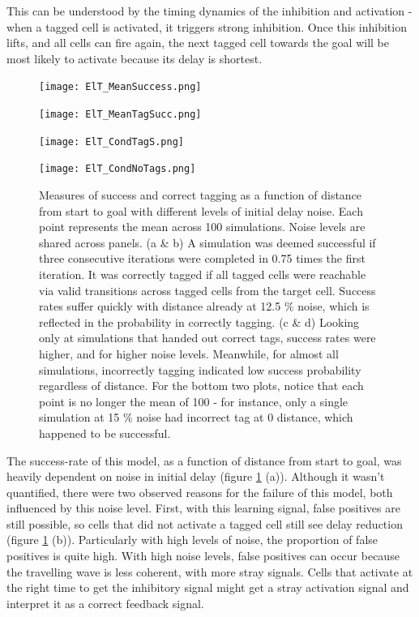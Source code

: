 \documentclass{article}
\begin{document}
    This can be understood by the timing dynamics of the inhibition and activation - when a tagged cell is activated, it triggers strong inhibition. Once this inhibition lifts, and all cells can fire again, the next tagged cell towards the goal will be most likely to activate because its delay is shortest. 

    \begin{figure}[H]
        \begin{minipage}[t]{0.5\linewidth}
            \subcaption{}
            \texttt{[image: ElT\_MeanSuccess.png]}
        \end{minipage}
        \begin{minipage}[t]{0.5\linewidth}
            \subcaption{}
            \texttt{[image: ElT\_MeanTagSucc.png]}
        \end{minipage}
        \begin{minipage}[t]{0.5\linewidth}
            \subcaption{}
            \texttt{[image: ElT\_CondTagS.png]}
        \end{minipage}
        \begin{minipage}[t]{0.5\linewidth}
            \subcaption{}
            \texttt{[image: ElT\_CondNoTags.png]}
        \end{minipage}
        \caption{Measures of success and correct tagging as a function of distance from start to goal with different levels of initial delay noise. Each point represents the mean across 100 simulations. Noise levels are shared across panels. (a \& b) A simulation was deemed successful if three consecutive iterations were completed in 0.75 times the first iteration. It was correctly tagged if all tagged cells were reachable via valid transitions across tagged cells from the target cell. Success rates suffer quickly with distance already at 12.5 \% noise, which is reflected in the probability in correctly tagging. (c \& d) Looking only at simulations that handed out correct tags, success rates were higher, and for higher noise levels. Meanwhile, for almost all simulations, incorrectly tagging indicated low success probability regardless of distance. For the bottom two plots, notice that each point is no longer the mean of 100 - for instance, only a single simulation at 15 \% noise had incorrect tag at 0 distance, which happened to be successful.}
        \label{success_rates_plot}
    \end{figure}

    The success-rate of this model, as a function of distance from start to goal, was heavily dependent on noise in initial delay (figure \ref{success_rates_plot} (a)). Although it wasn't quantified, there were two observed reasons for the failure of this model, both influenced by this noise level. First, with this learning signal, false positives are still possible, so cells that did not activate a tagged cell still see delay reduction (figure \ref{success_rates_plot} (b)). Particularly with high levels of noise, the proportion of false positives is quite high. With high noise levels, false positives can occur because the travelling wave is less coherent, with more stray signals. Cells that activate at the right time to get the inhibitory signal might get a stray activation signal and interpret it as a correct feedback signal.
\end{document}
